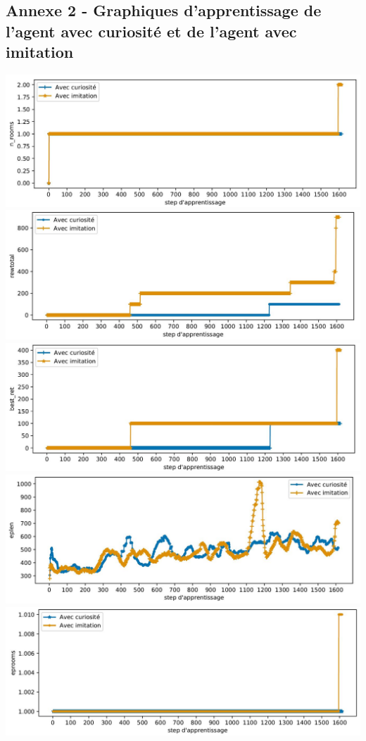 \documentclass[a4paper,12pt]{report}
\begin{document}
\newpage
\subsection*{Annexe 2 - Graphiques d'apprentissage de l'agent avec curiosité et de l'agent avec imitation}
\label{annexe_2}
    \centering
    \includegraphics[width=\textwidth]{curiosity_imitation/curiosity_imitation_n_rooms.JPG}
    \includegraphics[width=\textwidth]{curiosity_imitation/curiosity_imitation_rewtotal.JPG}
    \includegraphics[width=\textwidth]{curiosity_imitation/curiosity_imitation_best_ret.JPG}
    \includegraphics[width=\textwidth]{curiosity_imitation/curiosity_imitation_eplen.JPG}
    \includegraphics[width=\textwidth]{curiosity_imitation/curiosity_imitation_eprooms.JPG}
\end{document}
